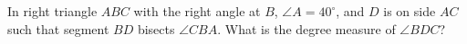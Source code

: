 In right triangle $ABC$ with the right angle at $B$, $\angle A=40^\circ$, and $D$ is on side $AC$ such that segment $BD$ bisects $\angle CBA$. What is the degree measure of $\angle BDC$?
